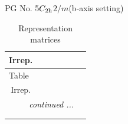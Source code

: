 \documentclass[fleqn,8pt,landscape]{jsarticle}
\begin{document}
\setcounter{MaxMatrixCols}{32}

\renewcommand{\tablename}{Table~}
\renewcommand{\figurename}{Figure~}
\begin{center}
\LARGE
PG No. 5\quad$C_{\rm 2h}$\quad$2/m$\quad(b-axis setting)\quad[ monoclinic ]
\end{center}
\renewcommand{\arraystretch}{1.2}
\begin{longtable}{ccccccc}
\caption{Representation matrices}
 \\
 \hline \hline
Irrep. &  &  &  &  &  &  \\ \hline \endfirsthead

\multicolumn{6}{l}{\tablename\ \thetable{}} \\
 \hline \hline
Irrep. &  &  &  &  &  &  \\ \hline \endhead

 \hline \hline
\multicolumn{6}{r}{\footnotesize\it continued ...} \\ \endfoot

 \hline \hline
\multicolumn{6}{r}{} \\ \endlastfoot


\end{longtable}
\end{document}
